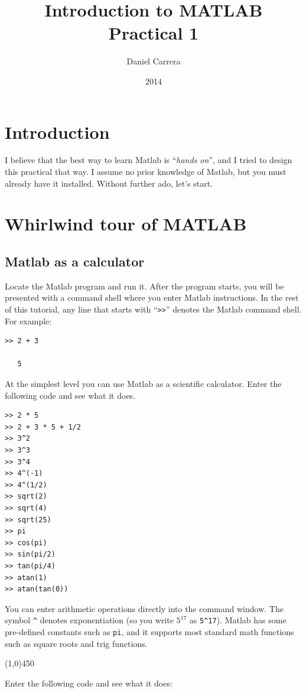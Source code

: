 \documentclass[12pt,a4paper]{article}   %
\author{Daniel Carrera}
\title{Introduction to MATLAB \\ Practical 1}
\date{2014}
\newcommand{\code}[1]{\texttt{#1}}
\newcommand{\ruler}{
  \begin{center}
    \line(1,0){450}
  \end{center}
}
\begin{document}
\maketitle

\section{Introduction}

I believe that the best way to learn Matlab is ``\textit{hands on}'', and I tried to
design this practical that way. I assume no prior knowledge of Matlab, but you must
already have it installed. Without further ado, let's start.


\section{Whirlwind tour of MATLAB}

\subsection{Matlab as a calculator}

Locate the Matlab program and run it. After the program starts, you will be presented with
a command shell where you enter Matlab instructions. In the rest of this tutorial,
any line that starts with ``\code{>>}'' denotes the Matlab command shell. For example:

\begin{verbatim}
>> 2 + 3

   5
\end{verbatim}

At the simplest level you can use Matlab as a scientific calculator. Enter the following
code and see what it does.

\begin{verbatim}
>> 2 * 5
>> 2 + 3 * 5 + 1/2
>> 3^2
>> 3^3
>> 3^4
>> 4^(-1)
>> 4^(1/2)
>> sqrt(2)
>> sqrt(4)
>> sqrt(25)
>> pi
>> cos(pi)
>> sin(pi/2)
>> tan(pi/4)
>> atan(1)
>> atan(tan(0))
\end{verbatim}

You can enter arithmetic operations directly into the command window. The symbol \code{\^}
denotes exponentiation (so you write $5^{17}$ as \code{5\^}\code{17}). Matlab has some pre-defined
constants such as \code{pi}, and it supports most standard math functions such as square
roots and trig functions.

\ruler

Enter the following code and see what it does:
\end{document}
